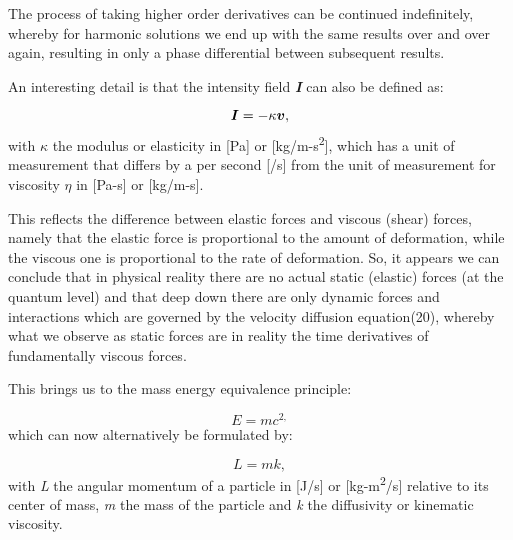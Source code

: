 \documentclass[a4paper]{article}
\newcommand\textstyleNone[1]{#1}
\newcounter{Text}
\newcommand\boldsubformula[1]{\text{\mathversion{bold}$#1$}}
\begin{document}
The process of taking higher order derivatives can be continued indefinitely, whereby for harmonic solutions we end up
with the same results over and over again, resulting in only a phase differential between subsequent results.  

An interesting detail is that the intensity field \textbf{\textit{I}} can also be defined as:

\begin{equation}\label{seq:refText26}
\boldsubformula I=-\kappa \boldsubformula v,
\end{equation}
with $\kappa $ the modulus or elasticity in [Pa] or [kg/m-s\textsuperscript{2}], which has a unit of measurement that
differs by a per second [/s] from the unit of measurement for viscosity \textstyleNone{$\eta $ in [Pa-s] or [kg/m-s].}

This reflects the difference between elastic forces and viscous (shear) forces, namely that the \textstyleNone{ elastic
force is proportional to the amount of deformation, while the viscous one is proportional to the rate of deformation.
So, it appears we can conclude that in physical reality there are no actual static (elastic) forces (at the quantum
level) and that deep down there are only dynamic forces and interactions which are governed by the velocity diffusion
equation(20), whereby what we observe as static forces are in reality the time derivatives of fundamentally viscous
forces.}

This brings us to the mass energy equivalence principle:

\begin{equation}
E=\mathit{mc}^{2,}
\end{equation}
which can now alternatively be formulated by:

\begin{equation}\label{seq:refText28}
L=mk,
\end{equation}
with \textit{L} the angular momentum of a particle in [J/s] or [kg-m\textsuperscript{2}/s] relative to its center of
mass, \textit{m} the mass of the particle and \textit{k} the diffusivity or kinematic viscosity. 
\end{document}
